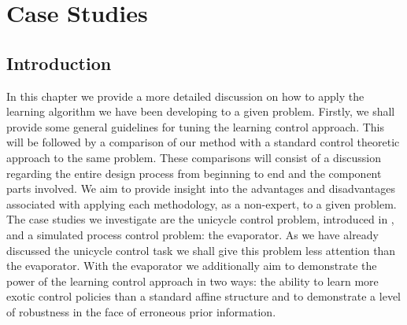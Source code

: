 \chapter{C\lowercase{ase} S\lowercase{tudies}}


\section{Introduction}
In this chapter we provide a more detailed discussion on how to apply the learning algorithm we have been developing to a given problem. Firstly, we shall provide some general guidelines for tuning the learning control approach. This will be followed by a comparison of our method with a standard control theoretic approach to the same problem. These comparisons will consist of a discussion regarding the entire design process from beginning to end and the component parts involved. We aim to provide insight into the advantages and disadvantages associated with applying each methodology, as a non-expert, to a given problem. The case studies we investigate are the unicycle control problem, introduced in , and a simulated process control problem: the evaporator.
%
As we have already discussed the unicycle control task we shall give this problem less attention than the evaporator. With the evaporator we additionally aim to demonstrate the power of the learning control approach in two ways: the ability to learn more exotic control policies than a standard affine structure and to demonstrate a level of robustness in the face of erroneous prior information.





